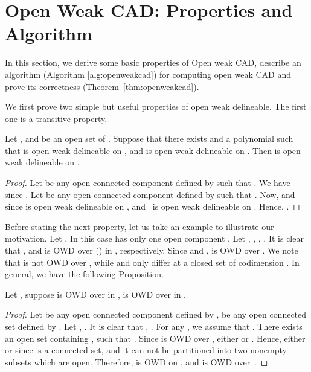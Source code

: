 \documentclass[amsthm]{elsart}
\begin{document}
\section{Open Weak CAD: Properties and Algorithm}\label{sec:refined}
In this section, we derive some basic properties of Open weak CAD, describe an algorithm (Algorithm \ref{alg:openweakcad}) for computing open weak CAD
and prove its correctness (Theorem~\ref{thm:openweakcad}). 

We first prove two simple but useful properties of open weak delineable. The first one is a transitive property.\begin{prop}  \label{prop:weaktransitive}
 Let , and  be an open set of . Suppose that there exists  and a polynomial  such that  is open weak delineable on , and  is open weak delineable on . Then  is open weak delineable on .
\end{prop}
\begin{proof}
Let  be any open connected component defined by  such that . We have  since . Let  be any open connected component defined by  such that . Now,  and  since  is open weak delineable on , and~ is open weak delineable on . Hence, .
\end{proof}
Before stating the next property, let us take an example to illustrate our motivation. Let . In this case  has only one open component . Let , , , . It is clear that  , and  is OWD over  () in , respectively. Since  and ,
  is OWD over . We note that  is not OWD over , while  and  only differ at a closed set of codimension . In general, we have the following Proposition.
\begin{prop} \label{prop:weakgcd}
 Let , suppose  is OWD over  in ,  is OWD over  in .\end{prop}

\begin{proof}
Let  be any open connected component defined by ,  be any open connected set defined by . Let , . It is clear that , . For any , we assume that . There exists an open set  containing , such that . Since  is OWD over , either  or . Hence, either  or  since  is a connected set, and it can not be partitioned into two nonempty subsets which are open. Therefore,  is OWD on , and  is OWD over~.
\end{proof}
\end{document}
